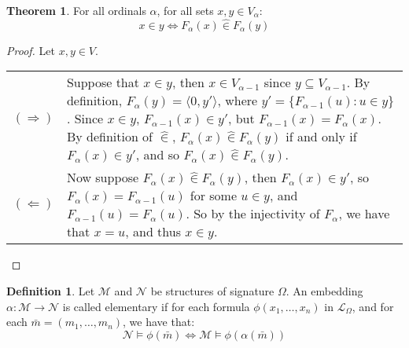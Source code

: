 \documentclass[11pt]{article}
\newcommand{\pair}[2]{\langle #1,#2 \rangle}
\newcommand{\zin}{\mathrel{\widehat{\in}}}
\theoremstyle{definition}
\theoremstyle{theorem}
\theoremstyle{lemma}
\newtheorem{definition}{Definition}[section]
\newtheorem{theorem}{Theorem}[section]
\begin{document}
\begin{theorem} For all ordinals $\alpha$, for all sets $x,y\in V_{\alpha}$:
  $$x\in y \Leftrightarrow F_\alpha(x) \zin F_\alpha(y)$$
\begin{proof} Let $x,y\in V$. \hspace \\

  \begin{tabular}{p{7mm} p{11.5cm}}
    $(\Rightarrow)$ \rule{0pt}{10ex} &
    Suppose that $x\in y$, then $x\in V_{\alpha-1}$ since $y\subseteq V_{\alpha-1}$.
    By definition, $F_\alpha(y) = \pair{0}{y'}$, where $y' = \{F_{\alpha-1}(u) : u\in y\}$.
    Since $x\in y$, $F_{\alpha-1}(x)\in y'$, but $F_{\alpha-1}(x)=F_\alpha(x)$.
    By definition of $\zin$, $F_{\alpha}(x)\zin F_\alpha(y)$ if and only if $F_\alpha(x) \in y'$, and so $F_\alpha(x) \zin F_\alpha(y)$.
    \\

    $(\Leftarrow)$ &
    Now suppose $F_\alpha(x) \zin F_\alpha(y)$, then $F_\alpha(x) \in y'$, so $F_\alpha(x) = F_{\alpha-1}(u)$ for some $u\in y$, and $F_{\alpha-1}(u) = F_{\alpha}(u)$.
    So by the injectivity of $F_\alpha$, we have that $x=u$, and thus $x\in y$.
  \end{tabular}
\end{proof}
\end{theorem}

\begin{definition} Let $\mathcal{M}$ and $\mathcal{N}$ be structures of signature $\Omega$.
An embedding $\alpha: \mathcal{M} \to \mathcal{N}$ is called elementary if for each formula $\phi(x_1,\ldots,x_n)$ in $\mathcal{L}_\Omega$, and for each $\bar{m} = (m_1,\ldots,m_n)$, we have that:
$$\mathcal N \vDash \phi(\bar m) \Leftrightarrow \mathcal M \vDash \phi(\alpha(\bar m))$$
\end{definition}
\end{document}
